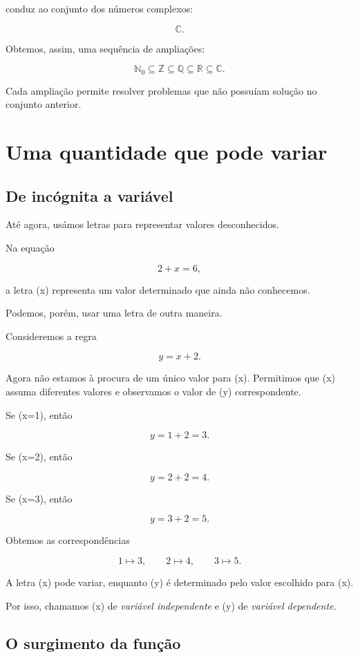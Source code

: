 \documentclass[12pt,a4paper]{article}
\begin{document}
conduz ao conjunto dos números complexos:

\[
\mathbb{C}.
\]

Obtemos, assim, uma sequência de ampliações:

\[
\mathbb{N}_0
\subseteq
\mathbb{Z}
\subseteq
\mathbb{Q}
\subseteq
\mathbb{R}
\subseteq
\mathbb{C}.
\]

Cada ampliação permite resolver problemas que não possuíam solução no
conjunto anterior.

\section{Uma quantidade que pode variar}

\subsection{De incógnita a variável}

Até agora, usámos letras para representar valores desconhecidos.

Na equação

\[
2+x=6,
\]

a letra (x) representa um valor determinado que ainda não conhecemos.

Podemos, porém, usar uma letra de outra maneira.

Consideremos a regra

\[
y=x+2.
\]

Agora não estamos à procura de um único valor para (x). Permitimos que
(x) assuma diferentes valores e observamos o valor de (y)
correspondente.

Se (x=1), então

\[
y=1+2=3.
\]

Se (x=2), então

\[
y=2+2=4.
\]

Se (x=3), então

\[
y=3+2=5.
\]

Obtemos as correspondências

\[
1\mapsto3,\qquad
2\mapsto4,\qquad
3\mapsto5.
\]

A letra (x) pode variar, enquanto (y) é determinado pelo valor
escolhido para (x).

Por isso, chamamos (x) de \emph{variável independente} e (y) de
\emph{variável dependente}.

\subsection{O surgimento da função}
\end{document}
